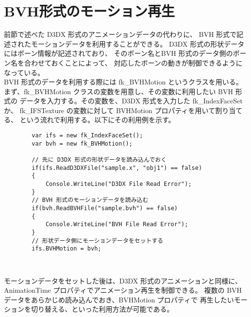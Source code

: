 \section{BVH形式のモーション再生} \label{sec:bvhmotion}
前節で述べた D3DX 形式のアニメーションデータの代わりに、
BVH 形式で記述されたモーションデータを利用することができる。
D3DX 形式の形状データにはボーン情報が記述されており、
そのボーン名とBVH 形式のデータ側のボーン名を合わせておくことによって、
対応したボーンの動きが制御できるようになっている。
\\
BVH 形式のデータを利用する際には fk\_BVHMotion というクラスを用いる。
まず、fk\_BVHMotion クラスの変数を用意し、その変数に利用したい BVH 形式の
データを入力する。その変数を、D3DX 形式を入力した fk\_IndexFaceSet か、
fk\_IFSTexture の変数に対して BVHMotion プロパティを用いて割り当てる、
という流れで利用する。以下にその利用例を示す。
\\
\begin{breakbox}
\begin{verbatim}
        var ifs = new fk_IndexFaceSet();
        var bvh = new fk_BVHMotion();
        
        // 先に D3DX 形式の形状データを読み込んでおく
        if(ifs.ReadD3DXFile("sample.x", "obj1") == false)
        {
            Console.WriteLine("D3DX File Read Error");
        }
        // BVH 形式のモーションデータを読み込む
        if(bvh.ReadBVHFile("sample.bvh") == false)
        {
            Console.WriteLine("BVH File Read Error");
        }
        // 形状データ側にモーションデータをセットする
        ifs.BVHMotion = bvh;
\end{verbatim}
\end{breakbox} ~

モーションデータをセットした後は、D3DX 形式のアニメーションと同様に、
AnimationTime プロパティでアニメーション再生を制御できる。
複数の BVH データをあらかじめ読み込んでおき、BVHMotion プロパティで
再生したいモーションを切り替える、といった利用方法が可能である。
